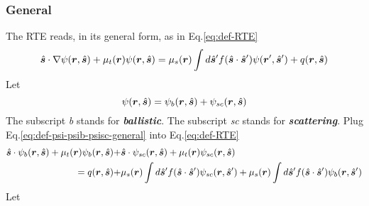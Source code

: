\documentclass [10pt,letterpaper]{article}
\renewcommand{\vec}{\vectorsym}
\newcommand{\unitvec}[1]{\hat{\vec{#1}}}
\begin{document}
\subsubsection{General}
\label{subsub:extracting-psib-general}
The RTE reads, in its general form, as in Eq.\eqref{eq:def-RTE}
\begin{equation*}
	\unitvec{s}\cdot\nabla\psi(\vec{r},\unitvec{s})
	+\mu_t(\vec{r})\psi(\vec{r},\unitvec{s})
	=
	\mu_s(\vec{r})
	\int d\unitvec{s}^\prime
	f(\unitvec{s}\cdot\unitvec{s}^\prime)
	\psi(\vec{r^\prime},\unitvec{s}^\prime)
	+q(\vec{r},\unitvec{s})
\end{equation*}
Let
\begin{equation} \label{eq:def-psi-psib-psisc-general}
	\psi(\vec{r},\unitvec{s})
	=
	\psi_b(\vec{r},\unitvec{s})
	+\psi_{sc}(\vec{r},\unitvec{s})
\end{equation}
The subscript \emph{b} stands for \emph{\bf ballistic}.
The subscript \emph{sc} stands for \emph{\bf scattering}.
Plug Eq.\eqref{eq:def-psi-psib-psisc-general} into Eq.\eqref{eq:def-RTE}
\begin{equation} \label{eq:der-extracting-psib-general-1}
	\begin{split}
		\unitvec{s}
		\cdot
		\psi_b(\vec{r},\unitvec{s})
		+
		\mu_t(\vec{r})
		\psi_b(\vec{r},\unitvec{s})
		+&
		\unitvec{s}
		\cdot
		\psi_{sc}(\vec{r},\unitvec{s})
		+
		\mu_t(\vec{r})
		\psi_{sc}(\vec{r},\unitvec{s})
		\\
		=
		q(\vec{r},\unitvec{s})
		+&
		\mu_s(\vec{r})
		\int d\unitvec{s}^\prime
		f(\unitvec{s}\cdot\unitvec{s}^\prime)
		\psi_{sc}(\vec{r},\unitvec{s}^\prime) 
		+ 
		\mu_s(\vec{r})
		\int d\unitvec{s}^\prime
		f(\unitvec{s}\cdot\unitvec{s}^\prime)
		\psi_{b}(\vec{r},\unitvec{s}^\prime) 
	\end{split}
\end{equation}
Let
\end{document}
